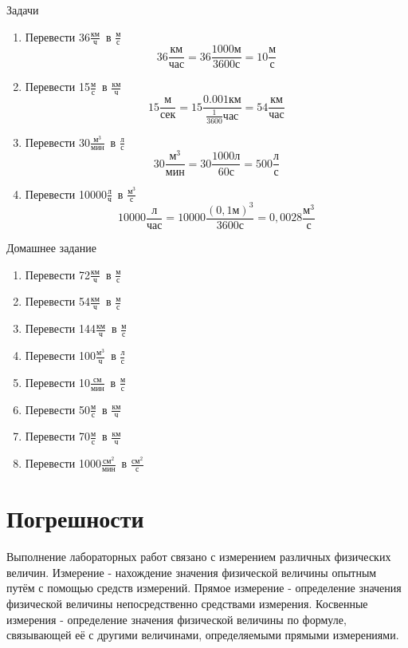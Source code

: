 \documentclass[a5paper, 10pt]{diss_4}
\newcommand{\kmh}{$\frac{км}{ч}$\ }
\newcommand{\ms}{$\frac{м}{с}$\ }
\newcommand{\lh}{$\frac{л}{ч}$\ }
\newcommand{\ls}{$\frac{л}{с}$\ }
\newcommand{\mks}{$\frac{м^3}{с}$\ }
\newcommand{\mkm}{$\frac{м^3}{мин}$\ }
\newcommand{\mkh}{$\frac{м^3}{ч}$\ }
\newcommand{\smm}{$\frac{см}{мин}$\ }
\newcommand{\smkvm}{$\frac{см^2}{мин}$\ }
\newcommand{\mkvs}{$\frac{см^2}{с}$\ }
\renewcommand{\'}{\,'}
\begin{document}
\begin{center}
Задачи
\end{center}

\begin{enumerate}
  \item{ Перевести  36\kmh в \ms \\
  \[36\frac{км}{час}=36\frac{1000 м}{3600 с}=10\frac{м}{с}\]
  }
  \item{ Перевести 15\ms в \kmh \\
  \[15\frac{м}{сек}=15\frac{0.001 км}{\frac{1}{3600} час}=54\frac{км}{час}\]
  }
  \item{ Перевести 30\mkm в \ls \\
  \[30\frac{м^3}{мин}=30\frac{1000 л}{60 с}=500\frac{л}{с}\]
  }
  \item{ Перевести 10000\lh в \mks \\
  \[10000\frac{л}{час}=10000\frac{(0,1м)^3}{3600 с}=0,0028\frac{м^3}{с}\]
  }
\end{enumerate}

\begin{center}
Домашнее задание
\end{center}

\begin{enumerate}
  \item Перевести 72\kmh в \ms
  \item Перевести 54\kmh в \ms
  \item Перевести 144\kmh в \ms
  \item Перевести 100\mkh в \ls
  \item Перевести 10\smm в \ms
  \item Перевести 50\ms в \kmh
  \item Перевести 70\ms в \kmh
  \item Перевести 1000\smkvm в \mkvs
\end{enumerate}
\newpage

\section{Погрешности}

  Выполнение лабораторных работ связано с измерением различных физических
величин. Измерение - нахождение значения физической величины опытным путём с
помощью средств измерений. Прямое измерение - определение значения физической
величины непосредственно средствами измерения. Косвенные измерения -
определение значения физической величины по формуле, связывающей её с другими
величинами, определяемыми прямыми измерениями.
\end{document}
